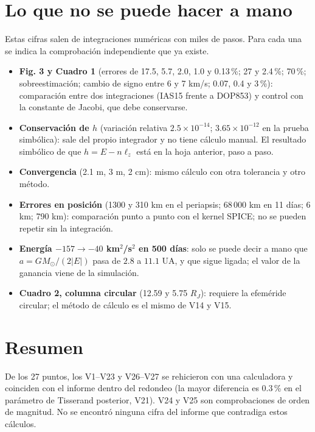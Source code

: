\documentclass[11pt,letterpaper]{article}
\begin{document}
\section{Lo que no se puede hacer a mano}
Estas cifras salen de integraciones numéricas con miles de pasos. Para cada una se indica la comprobación independiente que ya existe.
\begin{itemize}
\item \textbf{Fig. 3 y Cuadro 1} (errores de 17.5, 5.7, 2.0, 1.0 y 0.13\,\%; 27 y 2.4\,\%; 70\,\%; sobreestimación; cambio de signo entre 6 y 7 km/s; 0.07, 0.4 y 3\,\%): comparación entre dos integraciones (IAS15 frente a DOP853) y control con la constante de Jacobi, que debe conservarse.
\item \textbf{Conservación de $h$} (variación relativa $2.5\times10^{-14}$; $3.65\times10^{-12}$ en la prueba simbólica): sale del propio integrador y no tiene cálculo manual. El resultado simbólico de que $h=E-n\ell_z$ está en la hoja anterior, paso a paso.
\item \textbf{Convergencia} (2.1 m, 3 m, 2 cm): mismo cálculo con otra tolerancia y otro método.
\item \textbf{Errores en posición} (1300 y 310 km en el periapsis; 68\,000 km en 11 días; 6 km; 790 km): comparación punto a punto con el kernel SPICE; no se pueden repetir sin la integración.
\item \textbf{Energía $-157\to-40$ km$^2$/s$^2$ en 500 días}: solo se puede decir a mano que $a=GM_\odot/(2|E|)$ pasa de $2.8$ a $11.1$ UA, y que sigue ligada; el valor de la ganancia viene de la simulación.
\item \textbf{Cuadro 2, columna circular} (12.59 y 5.75 $R_J$): requiere la efeméride circular; el método de cálculo es el mismo de V14 y V15.
\end{itemize}

\section*{Resumen}
De los 27 puntos, los V1--V23 y V26--V27 se rehicieron con una calculadora y coinciden con el informe dentro del redondeo (la mayor diferencia es 0.3\,\% en el parámetro de Tisserand posterior, V21). V24 y V25 son comprobaciones de orden de magnitud. No se encontró ninguna cifra del informe que contradiga estos cálculos.
\end{document}
